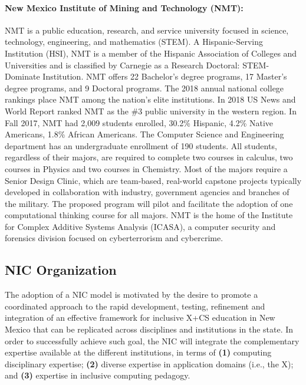 \paragraph{New Mexico Institute of Mining and Technology (NMT):}
NMT is a public education, research, and service university focused in science, technology, engineering, and mathematics (STEM). A Hispanic-Serving Institution (HSI), NMT is a member of the Hispanic Association of Colleges and Universities and is classified by Carnegie as a Research Doctoral: STEM-Dominate Institution. NMT offers 22 Bachelor’s degree programs, 17 Master’s degree programs, and 9 Doctoral programs. The 2018 annual national college rankings place NMT among the nation’s elite institutions. In 2018 US News and World Report ranked NMT as the \#3 public university in the western region. In Fall
2017, NMT had 2,009 students enrolled, 30.2\% Hispanic, 4.2\% Native Americans, 1.8\% African Americans.
The Computer Science and Engineering department has an undergraduate enrollment of 190 students. All
students, regardless of their majors, are required to complete two courses in calculus, two courses in
Physics and two courses in Chemistry. Most of the majors require a Senior Design Clinic, which are team-based,
real-world capstone projects typically developed in collaboration with industry, government agencies
and branches of the military. The proposed program will pilot and facilitate the adoption of one computational thinking course for all majors. NMT is the home of the Institute for Complex Additive Systems Analysis (ICASA), a computer security and forensics division focused on cyberterrorism and cybercrime.


\subsection{NIC Organization}
 
The adoption of a NIC model is motivated by the desire to promote a coordinated approach to the rapid development, testing, refinement and integration of an effective framework for inclusive X+CS education in New Mexico that can be replicated across disciplines and institutions in the state. In order to successfully achieve such goal, the NIC will integrate the complementary expertise available at the different institutions, in terms of 
{\bf (1)} computing disciplinary expertise; {\bf (2)} diverse expertise in application domains (i.e., the X); and 
{\bf (3)} expertise in inclusive computing pedagogy. 

